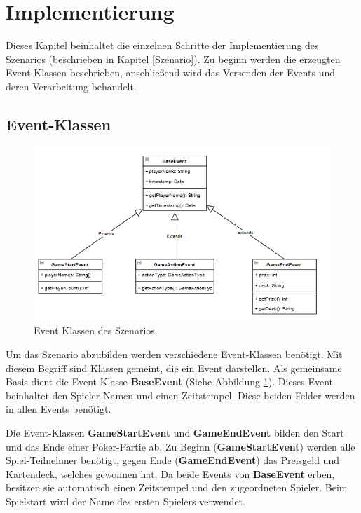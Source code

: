\section{Implementierung}
Dieses Kapitel beinhaltet die einzelnen Schritte der Implementierung des Szenarios (beschrieben in Kapitel \ref{Szenario}). Zu beginn werden die erzeugten Event-Klassen beschrieben, anschließend wird das Versenden der Events und deren Verarbeitung behandelt.

\subsection{Event-Klassen}

\begin{figure}[ht]
	\centering
	\includegraphics[width=\textwidth,height=\textheight,keepaspectratio]{images/Events.png}
	\caption{Event Klassen des Szenarios}
	\label{EventKlassen}
\end{figure}

Um das Szenario abzubilden werden verschiedene Event-Klassen benötigt. Mit diesem Begriff sind Klassen gemeint, die ein Event darstellen.
Als gemeinsame Basis dient die Event-Klasse \textbf{BaseEvent} (Siehe Abbildung \ref{EventKlassen}). Dieses Event beinhaltet den Spieler-Namen und einen Zeitstempel. Diese beiden Felder werden in allen Events benötigt.

Die Event-Klassen \textbf{GameStartEvent} und \textbf{GameEndEvent} bilden den Start und das Ende einer Poker-Partie ab. Zu Beginn (\textbf{GameStartEvent}) werden alle Spiel-Teilnehmer benötigt, gegen Ende (\textbf{GameEndEvent}) das Preisgeld und Kartendeck, welches gewonnen hat. Da beide Events von \textbf{BaseEvent} erben, besitzen sie automatisch einen Zeitstempel und den zugeordneten Spieler. Beim Spielstart wird der Name des ersten Spielers verwendet.

